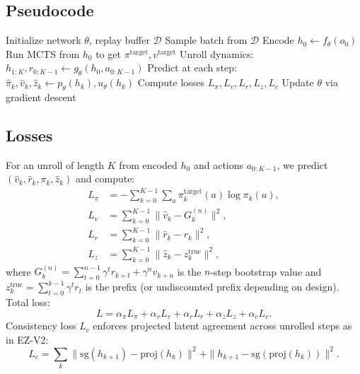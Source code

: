 \documentclass{article}
\begin{document}
\subsection{Pseudocode}
\begin{algorithm}[H]
\caption{MA-EZV2 Training Loop}
\begin{algorithmic}[1]
\State Initialize network $\theta$, replay buffer $\mathcal{D}$
    \State Sample batch from $\mathcal{D}$
    \State Encode $h_0 \leftarrow f_\theta(o_0)$
    \State Run MCTS from $h_0$ to get $\pi^{\text{target}}, v^{\text{target}}$
    \State Unroll dynamics: $h_{1:K}, r_{0:K-1} \leftarrow g_\theta(h_0, a_{0:K-1})$
    \State Predict at each step: $\hat{\pi}_k, \hat{v}_k, \hat{z}_k \leftarrow p_\theta(h_k), u_\theta(h_k)$
    \State Compute losses $L_\pi, L_v, L_r, L_z, L_c$
    \State Update $\theta$ via gradient descent
\EndFor
\end{algorithmic}
\end{algorithm}

\subsection{Losses}
For an unroll of length $K$ from encoded $h_0$ and actions $a_{0:K-1}$, we predict $(\hat v_k,\hat r_k,\pi_k,\hat z_k)$ and compute:
\begin{align}
L_\pi &= -\sum_{k=0}^{K-1}\sum_a \pi^{\text{target}}_k(a)\log \pi_k(a),\\
L_v &= \sum_{k=0}^{K-1} \|\hat v_k - G_k^{(n)}\|^2,\\
L_r &= \sum_{k=0}^{K-1} \|\hat r_k - r_k\|^2,\\
L_z &= \sum_{k=0}^{K-1} \|\hat z_k - z^{\text{true}}_k\|^2,
\end{align}
where $G_k^{(n)}=\sum_{t=0}^{n-1}\gamma^t r_{k+t}+\gamma^n v_{k+n}$ is the $n$-step bootstrap value and $z^{\text{true}}_k=\sum_{t=0}^{k-1}\gamma^t r_t$ is the prefix (or undiscounted prefix depending on design).
Total loss:
\begin{equation}
L = \alpha_\pi L_\pi + \alpha_v L_v + \alpha_r L_r + \alpha_z L_z + \alpha_c L_c .
\end{equation}
Consistency loss $L_c$ enforces projected latent agreement across unrolled steps as in EZ-V2:
\begin{equation}
L_c = \sum_{k}\|\mathrm{sg}(h_{k+1}) - \mathrm{proj}(h_k)\|^2 + \|h_{k+1} - \mathrm{sg}(\mathrm{proj}(h_k))\|^2.
\end{equation}
\end{document}
